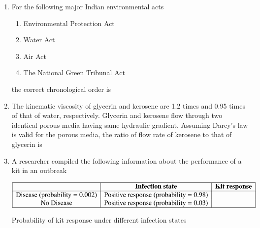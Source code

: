 \documentclass[journal,12pt,onecolumn]{IEEEtran}
\theoremstyle{remark}
\begin{document}
\begin{enumerate}
\newpage

\item For the following major Indian environmental acts
\begin{enumerate}[label=\roman*)]
\item Environmental Protection Act
\item Water Act 
\item Air Act 
\item The National Green Tribunal Act
\end{enumerate}
the correct chronological order  is

\begin{enumerate}
\end{enumerate}
\hfill{}

\item The kinematic viscosity of glycerin and kerosene are 1.2 times and 0.95 times of that of water, respectively. Glycerin and kerosene flow through two identical porous media having same hydraulic gradient. Assuming Darcy's law is valid for the porous media, the ratio of flow rate of kerosene to that of glycerin is

\begin{enumerate}
\end{enumerate}
\hfill{}
\item A researcher compiled the following information about the performance of a kit in an outbreak

\begin{table}[h!]
\centering
\[
\begin{array}{|c|c|c|}
\hline
 & \textbf{Infection state} & \textbf{Kit response} \\
\hline
\text{Disease (probability = 0.002)} & \text{Positive response (probability = 0.98)} &  \\
\text{No Disease} & \text{Positive response (probability = 0.03)} &  \\
\hline
\end{array}
\]
\caption{Probability of kit response under different infection states}
\label{tab:infection}
\end{table}



\end{enumerate}
\end{document}
